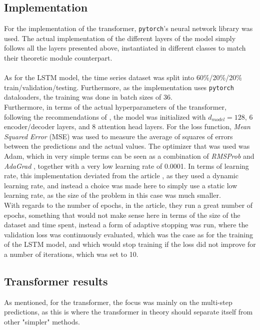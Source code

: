 \documentclass[main.tex]{subfiles}
\begin{document}
\subsection{Implementation}
For the implementation of the transformer, \texttt{pytorch}'s neural network library was used. The actual implementation of the different layers of the model simply follows all the layers presented above, instantiated in different classes to match their theoretic module counterpart.\\
\\
As for the LSTM model, the time series dataset was split into 60\%/20\%/20\% train/validation/testing. Furthermore, as the implementation uses \texttt{pytorch} dataloaders, the training was done in batch sizes of 36.\\
Furthermore, in terms of the actual hyperparameters of the transformer, following the recommendations of \cite{Attention}, the model was initialized with $d_{model} = 128$, 6 encoder/decoder layers, and 8 attention head layers. For the loss function, \textit{Mean Squared Error} (MSE) was used to measure the average of squares of errors between the predictions and the actual values. The optimizer that was used was Adam, which in very simple terms can be seen as a combination of \textit{RMSProb} and \textit{AdaGrad} \cite{kingma2017adam}, together with a very low learning rate of 0.0001. In terms of learning rate, this implementation deviated from the article \cite{Attention}, as they used a dynamic learning rate, and instead a choice was made here to simply use a static low learning rate, as the size of the problem in this case was much smaller.\\
With regards to the number of epochs, in the article\cite{Attention}, they run a great number of epochs, something that would not make sense here in terms of the size of the dataset and time spent, instead a form of adaptive stopping was run, where the validation loss was continuously evaluated, which was the case as for the training of the LSTM model, and which would stop training if the loss did not improve for a number of iterations, which was set to 10.

\subsection{Transformer results}
As mentioned, for the transformer, the focus was mainly on the multi-step predictions, as this is where the transformer in theory should separate itself from other "simpler" methods. 
\end{document}
